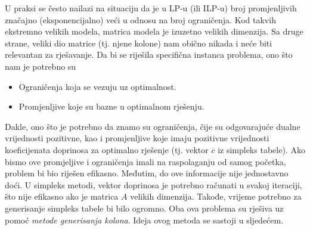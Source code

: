 \documentclass[b5paper, utf8, 11pt, colorlinks]{book}
\theoremstyle{definition}
\begin{document}
U praksi se često nailazi  na situaciju da je u LP-u (ili ILP-u) broj promjenljivih značajno (eksponencijalno) veći  u odnosu na broj ograničenja. Kod takvih ekstremno velikih modela, matrica modela je izuzetno velikih dimenzija. Sa druge strane, veliki dio matrice (tj. njene kolone) nam obično nikada i neće biti relevantan za rješavanje. Da bi se riješila specifična instanca problema, ono što nam je potrebno su
\begin{itemize}
    \item Ograničenja koja se vezuju uz optimalnost.
    \item Promjenljive koje su bazne u optimalnom rješenju.
\end{itemize}
Dakle, ono što je potrebno da znamo su ograničenja, čije su odgovarajuće dualne vrijednosti pozitivne, kao i promjenljive koje imaju pozitivne vrijednosti koeficijenata doprinosa za optimalno rješenje (tj. vektor  $\overline{c}$ iz simpleks tabele). Ako bismo  ove promjeljive i ograničenja imali na raspolaganju od samog početka, problem bi bio riješen efikasno. Međutim, do ove informacije nije jednostavno doći.  U simpleks metodi, vektor doprinosa je potrebno računati u svakoj iteraciji, što nije efikasno ako je matrica $A$ velikih dimenzija. Takođe, vrijeme potrebno za generisanje simpleks tabele bi bilo ogromno.  Oba ova problema su rješiva uz pomoć \emph{metode generisanja kolona}.  Ideja ovog metoda se sastoji u sljedećem. 
 
\end{document}
